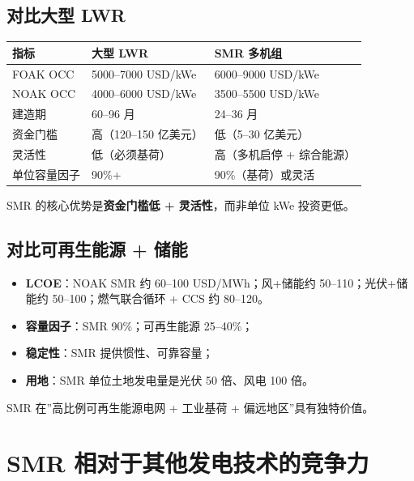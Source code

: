 \documentclass[
  UTF8,
  scheme=plain,
  fontsize=10pt,
  openany
]{ctexbook}
\begin{document}
\subsection{对比大型 LWR}\label{ux5bf9ux6bd4ux5927ux578b-lwr}

{\def\LTcaptype{none} %
\begin{longtable}[]{@{}lll@{}}
\toprule\noalign{}
指标 & 大型 LWR & SMR 多机组 \\
\midrule\noalign{}
\endhead
\bottomrule\noalign{}
\endlastfoot
FOAK OCC & 5000--7000 USD/kWe & 6000--9000 USD/kWe \\
NOAK OCC & 4000--6000 USD/kWe & 3500--5500 USD/kWe \\
建造期 & 60--96 月 & 24--36 月 \\
资金门槛 & 高（120--150 亿美元） & 低（5--30 亿美元） \\
灵活性 & 低（必须基荷） & 高（多机启停 + 综合能源） \\
单位容量因子 & 90\%+ & 90\%（基荷）或灵活 \\
\end{longtable}
}

SMR 的核心优势是\textbf{资金门槛低 + 灵活性}，而非单位 kWe 投资更低。

\subsection{对比可再生能源 +
储能}\label{ux5bf9ux6bd4ux53efux518dux751fux80fdux6e90-ux50a8ux80fd}

\begin{itemize}
\tightlist
\item
  \textbf{LCOE}：NOAK SMR 约 60--100 USD/MWh；风+储能约
  50--110；光伏+储能约 50--100；燃气联合循环 + CCS 约 80--120。
\item
  \textbf{容量因子}：SMR 90\%；可再生能源 25--40\%；
\item
  \textbf{稳定性}：SMR 提供惯性、可靠容量；
\item
  \textbf{用地}：SMR 单位土地发电量是光伏 50 倍、风电 100 倍。
\end{itemize}

SMR 在''高比例可再生能源电网 + 工业基荷 + 偏远地区''具有独特价值。

\section{SMR
相对于其他发电技术的竞争力}\label{smr-ux76f8ux5bf9ux4e8eux5176ux4ed6ux53d1ux7535ux6280ux672fux7684ux7adeux4e89ux529b}
\end{document}
